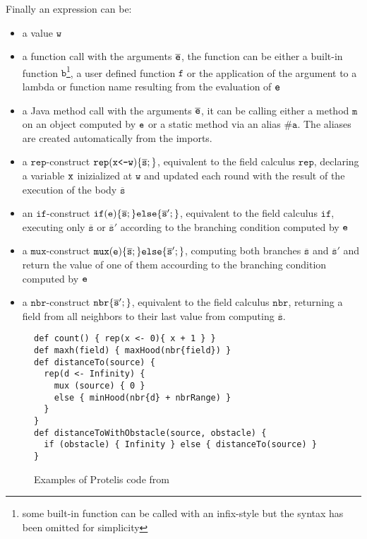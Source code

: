 Finally an expression can be:
\begin{itemize}
\item a value $\mathtt{w}$
\item a function call with the arguments $\overline{\mathtt{e}}$, the function can be either a built-in function $\mathtt{b}$\footnote{some built-in function can be called with an infix-style but the syntax has been omitted for simplicity}, a user defined function $\mathtt{f}$ or the application of the argument to a lambda or function name resulting from the evaluation of $\mathtt{e}$
\item a Java method call with the arguments $\overline{\mathtt{e}}$, it can be calling either a method $\mathtt{m}$ on an object computed by $\mathtt{e}$ or a static method via an alias $\#\mathtt{a}$. The aliases are created automatically from the imports.
\item a $\mathtt{rep}$-construct $\mathtt{rep}(\mathtt{x}\texttt{<-}\mathtt{w})\{ \overline{\mathtt{s}};\}$, equivalent to the field calculus $\mathtt{rep}$, declaring a variable $\mathtt{x}$ inizialized at $\mathtt{w}$ and updated each round with the result of the execution of the body $\overline{\mathtt{s}}$
\item an $\mathtt{if}$-construct $\mathtt{if}(\mathtt{e})\{\overline{\mathtt{s}};\}\mathtt{else}\{\overline{\mathtt{s}}';\}$, equivalent to the field calculus $\mathtt{if}$, executing only $\overline{\mathtt{s}}$ or $\overline{\mathtt{s}}'$ according to the branching condition computed by $\mathtt{e}$
\item a $\mathtt{mux}$-construct $\mathtt{mux}(\mathtt{e})\{\overline{\mathtt{s}};\}\mathtt{else}\{\overline{\mathtt{s}}';\}$, computing both branches $\overline{\mathtt{s}}$ and $\overline{\mathtt{s}}'$ and return the value of one of them accourding to the branching condition computed by $\mathtt{e}$
\item a $\mathtt{nbr}$-construct $\mathtt{nbr}\{\overline{\mathtt{s}}';\}$, equivalent to the field calculus $\mathtt{nbr}$, returning a field from all neighbors to their last value from computing $\overline{\mathtt{s}}$.
\end{itemize}

\begin{figure}[t]
\begin{lstlisting}[language={Protelis},frame=single,
  emph={count, maxh, distanceTo, distanceToWithObstacle}
]
def count() { rep(x <- 0){ x + 1 } }
def maxh(field) { maxHood(nbr{field}) }
def distanceTo(source) {
  rep(d <- Infinity) {
    mux (source) { 0 }
    else { minHood(nbr{d} + nbrRange) }
  }
}
def distanceToWithObstacle(source, obstacle) {
  if (obstacle) { Infinity } else { distanceTo(source) }
}
\end{lstlisting}
\caption{Examples of Protelis code from \cite{Protelis}}\label{fig:protelisexample}
\end{figure}

